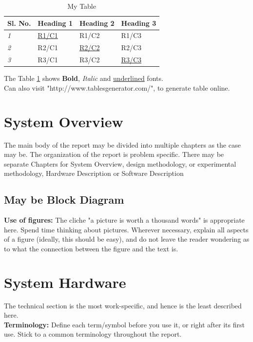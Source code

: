 \begin{table}[h]
\centering
\caption{My Table}
\label{tab:RC}
\begin{tabular}{|l|l|l|l|}
\hline
\textbf{Sl. No.} & \textbf{Heading 1} & \textbf{Heading 2} & \textbf{Heading 3} \\ \hline
\textit{1}       & { \underline{R1/C1}}        & R1/C2              & R1/C3              \\ \hline
\textit{2}       & R2/C1              & { \underline{R2/C2}}        & R2/C3              \\ \hline
\textit{3}       & R3/C1              & R3/C2              & { \underline{R3/C3}}        \\ \hline
\end{tabular}
\end{table}

The Table \ref{tab:RC} shows \textbf{Bold}, \textit{Italic} and \underline{underlined} fonts. \\
Can also visit "http://www.tablesgenerator.com/", to generate table online.

\chapter{System Overview}
The main body of the report may be divided into multiple chapters as the case may be. The organization of the report is problem specific. There may be separate Chapters for  System Overview, design methodology, or experimental methodology, Hardware Description or Software Description\\

\section{May be Block Diagram}

\textbf{Use of figures:} The cliche "a picture is worth a thousand words" is appropriate here. Spend time thinking about pictures. Wherever necessary, explain all aspects of a figure (ideally, this should be easy), and do not leave the reader wondering as to what the connection between the figure and the text is.


\chapter{System Hardware}
The technical section is the most work-specific, and hence is the least described here.\\
\textbf{Terminology: }Define each term/symbol before you use it, or right after its first use. Stick to a common terminology throughout the report. \\

